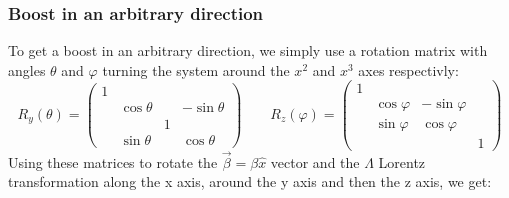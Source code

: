 \documentclass{article}
\begin{document}
\subsubsection{Boost in an arbitrary direction}
To get a boost in an arbitrary direction, we simply use a rotation matrix with angles $\theta$ and $\varphi$ turning the system around the $x^2$ and $x^3$ axes respectivly:
\begin{equation}
    R_y(\theta) = \begin{pmatrix}
        1 &  &  & \\
          & \cos\theta & &  -\sin\theta \\
          &  & 1 & \\
          & \sin\theta &  &  \cos\theta
    \end{pmatrix}
    \qquad
    R_z(\varphi) = \begin{pmatrix}
        1 & & & \\
        & \cos\varphi & -\sin\varphi & \\
        & \sin\varphi & \cos\varphi & \\
        & & & 1
    \end{pmatrix}
\end{equation}
Using these matrices to rotate the $\vec{\beta} = \beta\hat{x}$ vector and the $\Lambda$ Lorentz transformation along the x axis, around the y axis and then the z axis, we get:
\end{document}
